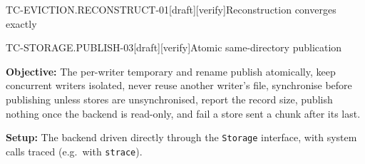\begin{requirement}{TC-EVICTION.RECONSTRUCT-01}[draft][verify]{Reconstruction converges exactly}


\end{requirement}

\begin{requirement}{TC-STORAGE.PUBLISH-03}[draft][verify]{Atomic same-directory publication}


  \textbf{Objective:} The per-writer temporary and rename publish atomically,
  keep concurrent writers isolated, never reuse another writer's file,
  synchronise before publishing unless stores are unsynchronised, report the
  record size, publish nothing once the backend is read-only, and fail a
  store sent a chunk after its last.

  \textbf{Setup:} The backend driven directly through the \texttt{Storage}
  interface, with system calls traced (e.g.\ with \texttt{strace}).


\end{requirement}
